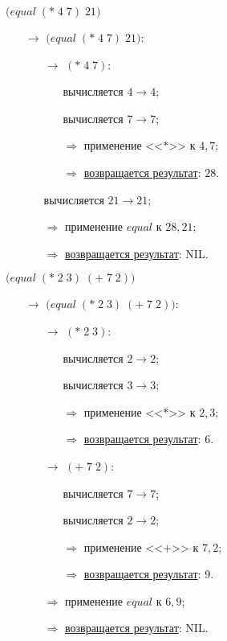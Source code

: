 \problem $\bigl(equal\; (*\; 4\; 7)\; 21\bigr)$

\begin{itemize}
	\item[$\longrightarrow$] $\bigl(equal\; (*\; 4\; 7)\; 21\bigr)$:
	\begin{itemize}
		\item[$\longrightarrow$] $(*\; 4\; 7)$:
		\begin{itemize}
			\item[\textbullet] вычисляется $4 \to 4$;
			\item[\textbullet] вычисляется $7 \to 7$;
			\item[$\Longrightarrow$] применение <<$*$>> к $4, 7$;
			\item[$\Longrightarrow$] \underline{возвращается результат}: $28$.
		\end{itemize}
		\item[\textbullet] вычисляется $21 \to 21$;
		\item[$\Longrightarrow$] применение $equal$ к $28, 21$;
		\item[$\Longrightarrow$] \underline{возвращается результат}: NIL.
	\end{itemize}
\end{itemize}


\newpage
\problem $\bigl(equal\; (*\; 2\; 3)\; (+\; 7\; 2) \bigr)$

\begin{itemize}
	\item[$\longrightarrow$] $\bigl(equal\; (*\; 2\; 3)\; (+\; 7\; 2) \bigr)$:
	\begin{itemize}
		\item[$\longrightarrow$] $(*\; 2\; 3)$:
		\begin{itemize}
			\item[\textbullet] вычисляется $2 \to 2$;
			\item[\textbullet] вычисляется $3 \to 3$;
			\item[$\Longrightarrow$] применение <<$*$>> к $2, 3$;
			\item[$\Longrightarrow$] \underline{возвращается результат}: $6$.
		\end{itemize}
		\item[$\longrightarrow$] $(+\; 7\; 2)$:
		\begin{itemize}
			\item[\textbullet] вычисляется $7 \to 7$;
			\item[\textbullet] вычисляется $2 \to 2$;
			\item[$\Longrightarrow$] применение <<$+$>> к $7, 2$;
			\item[$\Longrightarrow$] \underline{возвращается результат}: $9$.
		\end{itemize}
		\item[$\Longrightarrow$] применение $equal$ к $6, 9$;
		\item[$\Longrightarrow$] \underline{возвращается результат}: NIL.
	\end{itemize}
\end{itemize}


